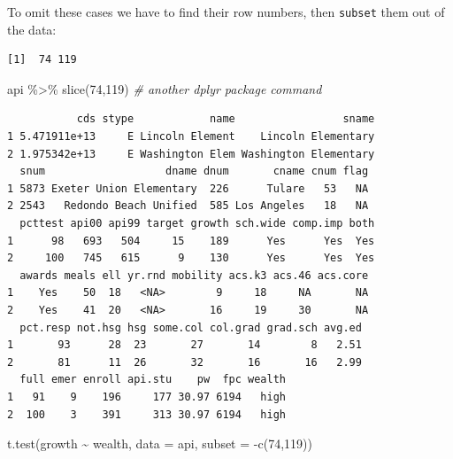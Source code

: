 \documentclass[
]{book}
\newenvironment{Shaded}{\begin{snugshade}}{\end{snugshade}}
\newcommand{\AttributeTok}[1]{\textcolor[rgb]{0.77,0.63,0.00}{#1}}
\newcommand{\CommentTok}[1]{\textcolor[rgb]{0.56,0.35,0.01}{\textit{#1}}}
\newcommand{\DecValTok}[1]{\textcolor[rgb]{0.00,0.00,0.81}{#1}}
\newcommand{\FunctionTok}[1]{\textcolor[rgb]{0.00,0.00,0.00}{#1}}
\newcommand{\NormalTok}[1]{#1}
\newcommand{\SpecialCharTok}[1]{\textcolor[rgb]{0.00,0.00,0.00}{#1}}
\begin{document}
To omit these cases we have to find their row numbers, then \texttt{subset} them out of the data:

\begin{Shaded}
\end{Shaded}

\begin{verbatim}
[1]  74 119
\end{verbatim}

\begin{Shaded}
\begin{Highlighting}[]
\NormalTok{api }\SpecialCharTok{\%\textgreater{}\%} \FunctionTok{slice}\NormalTok{(}\DecValTok{74}\NormalTok{,}\DecValTok{119}\NormalTok{)  }\CommentTok{\# another dplyr package command}
\end{Highlighting}
\end{Shaded}

\begin{verbatim}
           cds stype            name                 sname
1 5.471911e+13     E Lincoln Element    Lincoln Elementary
2 1.975342e+13     E Washington Elem Washington Elementary
  snum                   dname dnum       cname cnum flag
1 5873 Exeter Union Elementary  226      Tulare   53   NA
2 2543   Redondo Beach Unified  585 Los Angeles   18   NA
  pcttest api00 api99 target growth sch.wide comp.imp both
1      98   693   504     15    189      Yes      Yes  Yes
2     100   745   615      9    130      Yes      Yes  Yes
  awards meals ell yr.rnd mobility acs.k3 acs.46 acs.core
1    Yes    50  18   <NA>        9     18     NA       NA
2    Yes    41  20   <NA>       16     19     30       NA
  pct.resp not.hsg hsg some.col col.grad grad.sch avg.ed
1       93      28  23       27       14        8   2.51
2       81      11  26       32       16       16   2.99
  full emer enroll api.stu    pw  fpc wealth
1   91    9    196     177 30.97 6194   high
2  100    3    391     313 30.97 6194   high
\end{verbatim}

\begin{Shaded}
\begin{Highlighting}[]
\FunctionTok{t.test}\NormalTok{(growth }\SpecialCharTok{\textasciitilde{}}\NormalTok{ wealth, }\AttributeTok{data =}\NormalTok{ api, }\AttributeTok{subset =} \SpecialCharTok{{-}}\FunctionTok{c}\NormalTok{(}\DecValTok{74}\NormalTok{,}\DecValTok{119}\NormalTok{))}
\end{Highlighting}
\end{Shaded}
\end{document}

